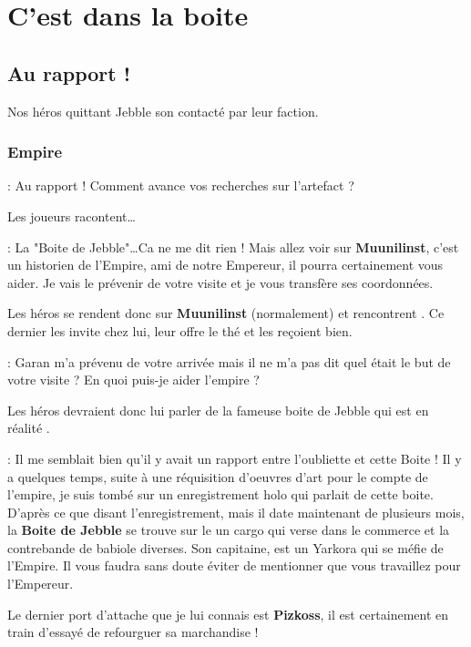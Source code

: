 \section{C’est dans la boite}


\subsection{Au rapport !}
Nos héros quittant Jebble son contacté par leur faction.

\subsubsection{Empire}
\begin{quotebox}
    : Au rapport ! Comment avance vos recherches sur l’artefact ?
\end{quotebox}
Les joueurs racontent\ldots
\begin{quotebox}
    : La "Boite de Jebble"\ldots Ca ne me dit rien ! Mais allez voir  sur \textbf{Muunilinst}, c’est un historien de l’Empire, ami de notre Empereur, il pourra certainement vous aider. Je vais le prévenir de votre visite et je vous transfère ses coordonnées.
\end{quotebox}

Les héros se rendent donc sur \textbf{Muunilinst} (normalement) et rencontrent . Ce dernier les invite chez lui, leur offre le thé et les reçoient bien.
\begin{quotebox}
    : Garan m’a prévenu de votre arrivée mais il ne m’a pas dit quel était le but de votre visite ? En quoi puis-je aider l’empire ?
\end{quotebox}
Les héros devraient donc lui parler de la fameuse boite de Jebble qui est en réalité .

\begin{quotebox}
    : Il me semblait bien qu’il y avait un rapport entre l’oubliette et cette Boite ! Il y a quelques temps, suite à une réquisition d’oeuvres d’art pour le compte de l’empire, je suis tombé sur un enregistrement holo qui parlait de cette boite. D’après ce que disant l’enregistrement, mais il date maintenant de plusieurs mois, la \textbf{Boite de Jebble} se trouve sur le  un cargo qui verse dans le commerce et la contrebande de babiole diverses. Son capitaine,  est un Yarkora qui se méfie de l’Empire. Il vous faudra sans doute éviter de mentionner que vous travaillez pour l’Empereur.

    Le dernier port d’attache que je lui connais est \textbf{Pizkoss}, il est certainement en train d’essayé de refourguer sa marchandise !
\end{quotebox}

